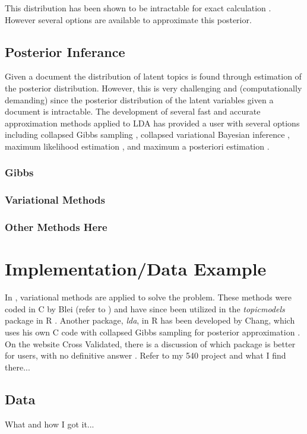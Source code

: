 \documentclass[3p,times]{elsarticle}
\begin{document}
This distribution has been shown to be intractable for exact calculation \cite{lda}. However several options are available to approximate this posterior.


\subsection{Posterior Inferance}
Given a document the distribution of latent topics is found through estimation of the posterior distribution. However, this is very challenging and (computationally demanding) since the posterior distribution of the latent variables given a document is intractable. The development of several fast and accurate approximation methods applied to LDA has provided a user with several options including collapsed Gibbs sampling \cite{CGS}, collapsed variational Bayesian inference \cite{CVB}, maximum likelihood estimation \cite{ML}, and maximum a posteriori estimation \cite{MAP}.


      \subsubsection{Gibbs}

      \subsubsection{Variational Methods}

      \subsubsection{Other Methods Here}

\section{Implementation/Data Example}
In \cite{lda}, variational methods are applied to solve the problem. These methods were coded in C by Blei (refer to \cite{Ccode}) and have since been utilized in the \textit{topicmodels} package in R \cite{topicsR}. Another package, \textit{lda}, in R has been developed by Chang, which uses his own C code with collapsed Gibbs sampling for posterior approximation \cite{ldaR}. On the website Cross Validated, there is a discussion of which package is better for users, with no definitive answer \cite{STACK}. Refer to my 540 project and what I find there...

	\subsection{Data}
	What and how I got it...
\end{document}
